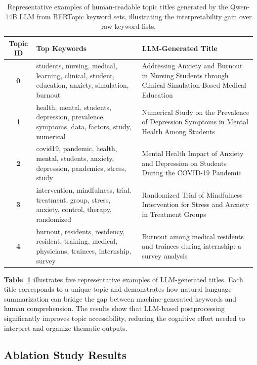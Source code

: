 \documentclass[authorproof,JACIII,researchpaper]{fujipressarticle}
\begin{document}
{\color{red}%
\begin{table}[!t]
\centering
\caption{Representative examples of human-readable topic titles generated by the Qwen-14B LLM from BERTopic keyword sets, illustrating the interpretability gain over raw keyword lists.}
\label{tab:topic_labels}
\footnotesize
\begin{tabular}{c p{5.5cm} p{8cm}}
\hline
\textbf{Topic ID} & \textbf{Top Keywords} & \textbf{LLM-Generated Title} \\
\hline
\textbf{0} & students, nursing, medical, learning, clinical, student, education, anxiety, simulation, burnout & Addressing Anxiety and Burnout in Nursing Students through Clinical Simulation-Based Medical Education \\
\hline
\textbf{1} & health, mental, students, depression, prevalence, symptoms, data, factors, study, numerical & Numerical Study on the Prevalence of Depression Symptoms in Mental Health Among Students \\
\hline
\textbf{2} & covid19, pandemic, health, mental, students, anxiety, depression, pandemics, stress, study & Mental Health Impact of Anxiety and Depression on Students During the COVID-19 Pandemic \\
\hline
\textbf{3} & intervention, mindfulness, trial, treatment, group, stress, anxiety, control, therapy, randomized & Randomized Trial of Mindfulness Intervention for Stress and Anxiety in Treatment Groups \\
\hline
\textbf{4} & burnout, residents, residency, resident, training, medical, physicians, trainees, internship, survey & Burnout among medical residents and trainees during internship: a survey analysis \\
\hline
\end{tabular}
\end{table}
}%

{\color{red}\textbf{Table~\ref{tab:topic_labels}} illustrates five representative examples of LLM-generated titles.} Each title corresponds to a unique topic and demonstrates how natural language summarization can bridge the gap between machine-generated keywords and human comprehension. The results show that LLM-based postprocessing significantly improves topic accessibility, reducing the cognitive effort needed to interpret and organize thematic outputs.

\subsection{Ablation Study Results}
\end{document}
